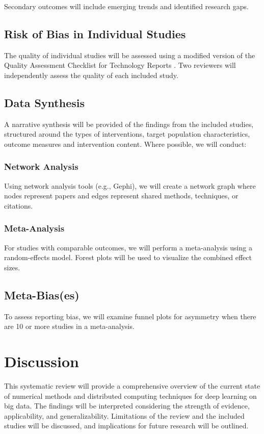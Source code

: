 \documentclass[a4paper,12pt]{article}
\begin{document}
Secondary outcomes will include emerging trends and identified research gaps.

\subsection{Risk of Bias in Individual Studies}
The quality of individual studies will be assessed using a modified version of the Quality Assessment Checklist for Technology Reports \citep{kitchenham2007guidelines}. Two reviewers will independently assess the quality of each included study.

\subsection{Data Synthesis}
A narrative synthesis will be provided of the findings from the included studies, structured around the types of interventions, target population characteristics, outcome measures and intervention content. Where possible, we will conduct:

\subsubsection{Network Analysis}
Using network analysis tools (e.g., Gephi), we will create a network graph where nodes represent papers and edges represent shared methods, techniques, or citations.

\subsubsection{Meta-Analysis}
For studies with comparable outcomes, we will perform a meta-analysis using a random-effects model. Forest plots will be used to visualize the combined effect sizes.

\subsection{Meta-Bias(es)}
To assess reporting bias, we will examine funnel plots for asymmetry when there are 10 or more studies in a meta-analysis.

\section{Discussion}
This systematic review will provide a comprehensive overview of the current state of numerical methods and distributed computing techniques for deep learning on big data. The findings will be interpreted considering the strength of evidence, applicability, and generalizability. Limitations of the review and the included studies will be discussed, and implications for future research will be outlined.



\end{document}
